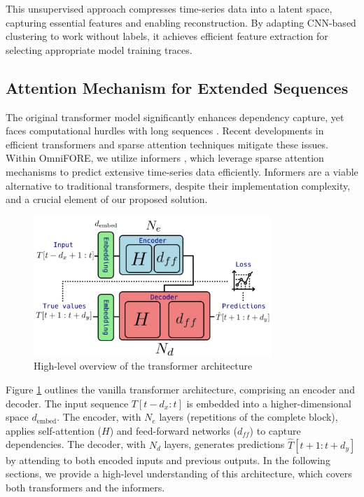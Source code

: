 \documentclass{ieeetmlcn}
\begin{document}
This unsupervised approach compresses time-series data into a latent space, capturing essential features and enabling reconstruction. By adapting CNN-based clustering to work without labels, it achieves efficient feature extraction for selecting appropriate model training traces.

\subsection{Attention Mechanism for Extended Sequences}

The original transformer model \cite{vaswani2017attention} significantly enhances dependency capture, yet faces computational hurdles with long sequences \cite{wen2022transformers}. Recent developments in efficient transformers \cite{fasterandlightertransformers} and sparse attention techniques \cite{gorbett2023sparse, STRec, ma2024multivariate} mitigate these issues. Within OmniFORE, we utilize informers \cite{zhou2021informer}, which leverage sparse attention mechanisms to predict extensive time-series data efficiently. Informers are a viable alternative to traditional transformers, despite their implementation complexity, and a crucial element of our proposed solution.

\begin{figure}\centering
\centering
\centering\includegraphics[width=0.8\textwidth]{img/Transformer_Architecture.png}
\caption{High-level overview of the transformer architecture}
\label{fig:Transformer_Architecture}
\end{figure}

Figure \ref{fig:Transformer_Architecture} outlines the vanilla transformer architecture, comprising an encoder and decoder. The input sequence $T[t-d_x:t]$ is embedded into a higher-dimensional space $d_{\text{embed}}$. The encoder, with $N_e$ layers (repetitions of the complete block), applies self-attention ($H$) and feed-forward networks ($d_{ff}$) to capture dependencies. The decoder, with $N_d$ layers, generates predictions $\hat{T}[t+1:t+d_y]$ by attending to both encoded inputs and previous outputs. In the following sections, we provide a high-level understanding of this architecture, which covers both transformers and the informers.
\end{document}
